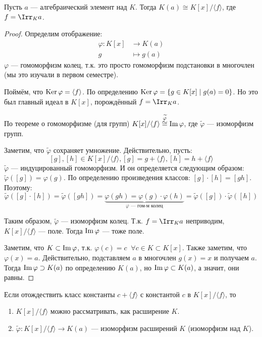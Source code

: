 \begin{theorem}
    Пусть $a$ --- алгебраический элемент над $K$. Тогда $K(a) \cong K[x] / \langle f \rangle$, где \\ $f = \Irr_K a$.
\end{theorem}
\begin{proof}
    Определим отображение:
    \begin{align*}
        \varphi : K[x] &\to K(a) \\
        g &\mapsto g(a) 
    \end{align*}
    $\varphi$ --- гомоморфизм колец, т.к. это просто гомоморфизм подстановки в многочлен (мы это изучали в первом семестре).
    
    Поймём, что $\operatorname{Ker} \varphi = \langle f \rangle$. По определению
    $\operatorname{Ker} \varphi = \{ g \in K[x] \mid g(a) = 0 \}$. Но это был главный идеал в $K[x]$, порождённый $f = \Irr_K a$.

    По теореме о гомоморфизме (для групп) $K[x] / \langle f \rangle \overset{\widetilde{\varphi}}\cong \operatorname{Im} \varphi$, где $\widetilde{\varphi}$ --- изоморфизм групп.

    Заметим, что $\widetilde{\varphi}$ сохраняет умножение. Действительно, пусть:
    $$[g], [h] \in K[x]/\langle f \rangle, [g] = g + \langle f \rangle, [h] = h + \langle f \rangle$$
    $\widetilde{\varphi}$ --- индуцированный гомоморфизм. 
    И он определяется следующим образом: $\widetilde{\varphi}([g]) = \varphi(g)$. По определению произведения классов: $[g] \cdot [h] = [gh]$. Поэтому:
    $$\widetilde{\varphi}([g] \cdot [h]) = \widetilde{\varphi}([gh]) = \underbrace{\varphi(gh) = \varphi(g) \cdot \varphi(h)}_{\text{$\varphi$ --- гом-м колец}} = \widetilde{\varphi}([g]) \cdot 
    \widetilde{\varphi}([h])$$

    Таким образом, $\widetilde{\varphi}$ --- изоморфизм колец. Т.к. $f = \Irr_K a$ неприводим, $K[x] / \langle f \rangle$ --- поле.
    Тогда $\operatorname{Im} \varphi$ --- тоже поле. 

    Заметим, что $K \subset \operatorname{Im} \varphi$, т.к. $\varphi(c) = c \;\; \forall c \in K \subset K[x]$. Также заметим, что $\varphi(x) = a$. Действительно, подставляем $a$ в многочлен $g(x) = x$ и получаем $a$. Тогда $\operatorname{Im} \varphi \supset K(a)$ по определению $K(a)$, но $\operatorname{Im} \varphi \subset K(a)$, а значит, они равны.
\end{proof}

\notice Если отождествить класс константы $c + \langle f \rangle$ с константой $c$ в $K[x] / \langle f \rangle$, то 
\begin{enumerate}
    \item $K[x] / \langle f \rangle$ можно рассматривать, как расширение $K$.
    \item $\widetilde{\varphi} : K[x]/ \langle f \rangle \to K(a)$ --- изоморфизм расширений $K$ (изоморфизм над $K$).
\end{enumerate}